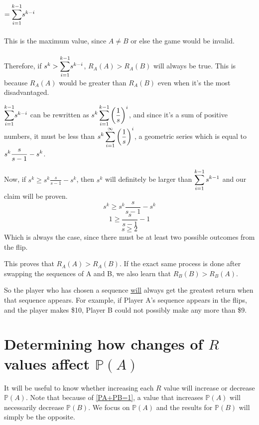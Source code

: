 \documentclass[english,12pt,a4paper,final]{article}
\begin{document}
$=\mathlarger\sum_{i=1}^{k-1}s^{k-i}$
\\\\
This is the maximum value, since $A \neq B$ or else the game would be invalid.
\\\\
Therefore, if $s^k > \mathlarger\sum_{i=1}^{k-1}s^{k-i}$, ${R_A(A) > R_A(B)}$ will always be true. This is because $R_A(A)$ would be greater than $R_A(B)$ even when it's the most disadvantaged.

$\mathlarger\sum_{i=1}^{k-1}s^{k-i}$ can be rewritten as
$\mathlarger{s^k \sum_{i=1}^{k-1}\left(\frac{1}{s}\right)^i}$, and since it's a sum of positive numbers, it must be less than $\mathlarger{s^k\sum_{i=1}^{\infty}\left(\frac{1}{s}\right)^i}$, a geometric series which is equal to $\mathlarger{s^k\frac{s}{s-1} - s^k}$.

Now, if $s^k \ge s^k\frac{s}{s-1} - s^k$, then $s^k$ will definitely be larger than $\mathlarger{\sum_{i=1}^{k-1}s^{k-1}}$ and our claim will be proven.
\\
\begin{equation*}
	s^k \ge s^k\frac{s}{s-1} - s^k
\end{equation*}
\begin{equation*}
	1 \ge \frac{s}{s-1} - 1
\end{equation*}
\begin{equation*}
	s \ge 2
\end{equation*}
Which is always the case, since there must be at least two possible outcomes from the flip.

This proves that ${R_A(A) > R_A(B)}$. If the exact same process is done after swapping the sequences of A and B, we also learn that $R_B(B)>R_B(A)$.

So the player who has chosen a sequence \underline{will} always get the greatest return when that sequence appears. For example, if Player A's sequence appears in the flips, and the player makes \$10, Player B could not possibly make any more than \$9.

\section{Determining how changes of $R$ values affect $\mathbb{P}(A)$}

It will be useful to know whether increasing each $R$ value will increase or decrease $\mathbb{P}(A)$. Note that because of \eqref{PA+PB=1}, a value that increases $\mathbb{P}(A)$ will necessarily decrease $\mathbb{P}(B)$. We focus on $\mathbb{P}(A)$ and the results for $\mathbb{P}(B)$ will simply be the opposite.
\end{document}
